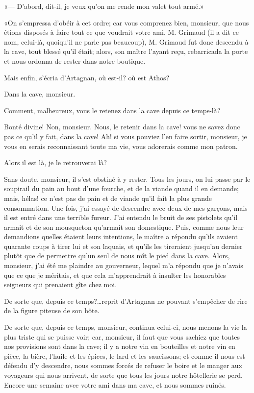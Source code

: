 «--- D'abord, dit-il, je veux qu'on me rende mon valet tout armé.» 

«On s'empressa d'obéir à cet ordre; car vous comprenez bien, monsieur, que nous étions disposés à faire tout ce que voudrait votre ami. M. Grimaud (il a dit ce nom, celui-là, quoiqu'il ne parle pas beaucoup), M. Grimaud fut donc descendu à la cave, tout blessé qu'il était; alors, son maître l'ayant reçu, rebarricada la porte et nous ordonna de rester dans notre boutique. 

\speak  Mais enfin, s'écria d'Artagnan, où est-il? où est Athos? 

\speak  Dans la cave, monsieur. 

\speak  Comment, malheureux, vous le retenez dans la cave depuis ce temps-là? 

\speak  Bonté divine! Non, monsieur. Nous, le retenir dans la cave! vous ne savez donc pas ce qu'il y fait, dans la cave! Ah! si vous pouviez l'en faire sortir, monsieur, je vous en serais reconnaissant toute ma vie, vous adorerais comme mon patron. 

\speak  Alors il est là, je le retrouverai là? 

\speak  Sans doute, monsieur, il s'est obstiné à y rester. Tous les jours, on lui passe par le soupirail du pain au bout d'une fourche, et de la viande quand il en demande; mais, hélas! ce n'est pas de pain et de viande qu'il fait la plus grande consommation. Une fois, j'ai essayé de descendre avec deux de mes garçons, mais il est entré dans une terrible fureur. J'ai entendu le bruit de ses pistolets qu'il armait et de son mousqueton qu'armait son domestique. Puis, comme nous leur demandions quelles étaient leurs intentions, le maître a répondu qu'ils avaient quarante coups à tirer lui et son laquais, et qu'ils les tireraient jusqu'au dernier plutôt que de permettre qu'un seul de nous mît le pied dans la cave. Alors, monsieur, j'ai été me plaindre au gouverneur, lequel m'a répondu que je n'avais que ce que je méritais, et que cela m'apprendrait à insulter les honorables seigneurs qui prenaient gîte chez moi. 

\speak  De sorte que, depuis ce temps?\dots reprit d'Artagnan ne pouvant s'empêcher de rire de la figure piteuse de son hôte. 

\speak  De sorte que, depuis ce temps, monsieur, continua celui-ci, nous menons la vie la plus triste qui se puisse voir; car, monsieur, il faut que vous sachiez que toutes nos provisions sont dans la cave; il y a notre vin en bouteilles et notre vin en pièce, la bière, l'huile et les épices, le lard et les saucissons; et comme il nous est défendu d'y descendre, nous sommes forcés de refuser le boire et le manger aux voyageurs qui nous arrivent, de sorte que tous les jours notre hôtellerie se perd. Encore une semaine avec votre ami dans ma cave, et nous sommes ruinés. 

